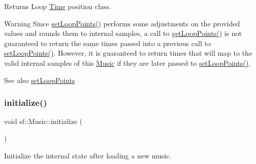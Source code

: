 \begin{DoxyReturn}{Returns}
Loop \mbox{\hyperlink{classsf_1_1_time}{Time}} position class.
\end{DoxyReturn}
\begin{DoxyWarning}{Warning}
Since \mbox{\hyperlink{classsf_1_1_music_ae7b339f0a957dfad045f3f28083a015e}{set\+Loop\+Points()}} performs some adjustments on the provided values and rounds them to internal samples, a call to \mbox{\hyperlink{classsf_1_1_music_aae3451cad5c16ee6a6e124e62ed61361}{get\+Loop\+Points()}} is not guaranteed to return the same times passed into a previous call to \mbox{\hyperlink{classsf_1_1_music_ae7b339f0a957dfad045f3f28083a015e}{set\+Loop\+Points()}}. However, it is guaranteed to return times that will map to the valid internal samples of this \mbox{\hyperlink{classsf_1_1_music}{Music}} if they are later passed to \mbox{\hyperlink{classsf_1_1_music_ae7b339f0a957dfad045f3f28083a015e}{set\+Loop\+Points()}}.
\end{DoxyWarning}
\begin{DoxySeeAlso}{See also}
\mbox{\hyperlink{classsf_1_1_music_ae7b339f0a957dfad045f3f28083a015e}{set\+Loop\+Points}} \begin{DoxyVerb}\end{DoxyVerb}
 
\end{DoxySeeAlso}
\mbox{\label{classsf_1_1_music_a5da7929d371fda9bb5fdbb0ee0fdce5f}} 
\subsubsection{\texorpdfstring{initialize()}{initialize()}}
{\footnotesize\ttfamily void sf\+::\+Music\+::initialize (\begin{DoxyParamCaption}{ }\end{DoxyParamCaption})\hspace{0.3cm}{\ttfamily [private]}}



Initialize the internal state after loading a new music. 

\begin{DoxyVerb}\end{DoxyVerb}
 \mbox{\label{classsf_1_1_music_aca1bcb4e5d56a854133e74bd86374463}} 
